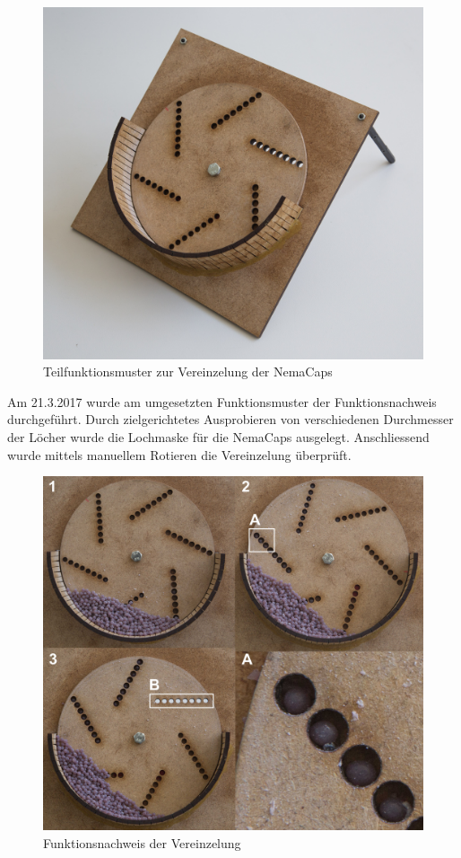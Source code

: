 \begin{figure}[H]
	\includegraphics[width=1\textwidth]{Illustrationen/5-Konzept/funktmuster_vereinzelung.jpg}
	\caption{Teilfunktionsmuster zur Vereinzelung der NemaCaps}
	\label{fig:funktmuster_vereinzelung}
\end{figure}
Am 21.3.2017 wurde am umgesetzten Funktionsmuster der Funktionsnachweis durchgeführt. Durch zielgerichtetes Ausprobieren von verschiedenen Durchmesser der Löcher wurde die Lochmaske für die NemaCaps ausgelegt. Anschliessend wurde mittels manuellem Rotieren die Vereinzelung überprüft.
\begin{figure}[H]
	\includegraphics[width=1\textwidth]{Illustrationen/5-Konzept/funktion_vereinzelung.jpg}
	\caption{Funktionsnachweis der Vereinzelung}
	\label{fig:funktion_vereinzelung}
\end{figure}
